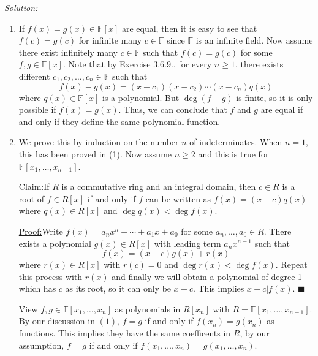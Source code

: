 \documentclass[a4paper, 12pt]{article}
\newenvironment{solution}
    {\textit{Solution:}}
    {}
\newenvironment{claim}[1]{\par\noindent\underline{Claim:}\space#1}{}
\newenvironment{claimproof}[1]{\par\noindent\underline{Proof:}\space#1}{\hfill $\blacksquare$}
\begin{document}
\begin{solution}
\begin{enumerate}[(1)]
\item If \(f(x)=g(x)\in \mathbb{F}[x]\) are equal, then it is easy to see that \(f(c)=g(c)\) for infinite many \(c\in \mathbb{F}\) since \(\mathbb{F}\) is an infinite field. Now assume there exist infinitely many \(c\in \mathbb{F}\) such that \(f(c)=g(c)\) for some 
\(f,g\in \mathbb{F}[x]\). Note that by Exercise 3.6.9., for every \(n\geq 1\), there exists different \(c_1,c_2,\ldots,c_n\in \mathbb{F}\) such that 
\[f(x)-g(x)=(x-c_1)(x-c_2)\cdots(x-c_n)q(x)\]
where \(q(x)\in \mathbb{F}[x]\) is a polynomial. But \(\deg (f-g)\) is finite, so it is only possible if \(f(x)=g(x)\). Thus, we can conclude that \(f\) and \(g\) are equal if and only if they define the same polynomial function.
\item We prove this by induction on the number \(n\) of indeterminates. When \(n=1\), this has been proved in (1). Now assume \(n\geq 2\) and this is true for \(\mathbb{F}[x_1,\ldots,x_{n-1}]\).

\begin{claim}
If \(R\) is a commutative ring and an integral domain, then \(c\in R\) is a root of \(f\in R[x]\) if and only if \(f\) can be written as \(f(x)=(x-c)q(x)\) where \(q(x)\in R[x]\) and \(\deg q(x)<\deg f(x)\).
\end{claim}
\begin{claimproof}
Write \(f(x)=a_nx^n+\cdots+a_1x+a_0\) for some \(a_n,\ldots,a_0\in R\). There exists a polynomial \(g(x)\in R[x]\) with leading term \(a_nx^{n-1}\) such that 
\[f(x)=(x-c)g(x)+r(x)\]
where \(r(x)\in R[x]\) with \(r(c)=0\) and \(\deg r(x)<\deg f(x)\). Repeat this process with \(r(x)\) and finally we will obtain a polynomial of degree 1 which has \(c\) as its root, so it can only be \(x-c\). This implies \(x-c|f(x)\). 
\end{claimproof}

View \(f,g\in \mathbb{F}[x_1,\ldots,x_n]\) as polynomials in \(R[x_n]\) with \(R=\mathbb{F}[x_1,\ldots,x_{n-1}]\). By our discussion in \((1)\), \(f=g\) if and only if \(f(x_n)=g(x_n)\) as functions. This implies they have the same coefficents in \(R\), by our assumption, 
\(f=g\) if and only if \(f(x_1,\ldots,x_n)=g(x_1,\ldots,x_n)\).
\end{enumerate}
\end{solution}
\end{document}
